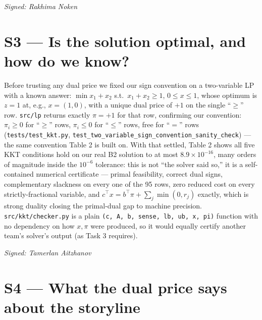 \documentclass[11pt]{article}
\begin{document}
\vspace{4pt}\noindent\textit{Signed: Rakhima Noken}

\section{S3 --- Is the solution optimal, and how do we know?}

Before trusting any dual price we fixed our sign convention on a two-variable LP with a known
answer: $\min x_1+x_2$ s.t.\ $x_1+x_2\ge1$, $0\le x\le1$, whose optimum is $z=1$ at, e.g.,
$x=(1,0)$, with a unique dual price of $+1$ on the single ``$\ge$'' row. \texttt{src/lp} returns
exactly $\pi=+1$ for that row, confirming our convention: $\pi_i\ge0$ for ``$\ge$'' rows,
$\pi_i\le0$ for ``$\le$'' rows, free for ``$=$'' rows (\texttt{tests/test\_kkt.py},
\texttt{test\_two\_variable\_sign\_convention\_sanity\_check}) --- the same convention Table 2 is
built on. With that settled, Table 2 shows all five KKT conditions hold on our real B2 solution to
at most $8.9\times10^{-16}$, many orders of magnitude inside the $10^{-6}$ tolerance: this is not
``the solver said so,'' it is a self-contained numerical certificate --- primal feasibility, correct
dual signs, complementary slackness on every one of the 95 rows, zero reduced cost on every
strictly-fractional variable, and $c^\top x=b^\top\pi+\sum_j\min(0,r_j)$ exactly, which is strong
duality closing the primal-dual gap to machine precision. \texttt{src/kkt/checker.py} is a plain
\texttt{(c, A, b, sense, lb, ub, x, pi)} function with no dependency on how $x,\pi$ were produced,
so it would equally certify another team's solver's output (as Task 3 requires).

\vspace{4pt}\noindent\textit{Signed: Tamerlan Aitzhanov}

\section{S4 --- What the dual price says about the storyline}
\end{document}
